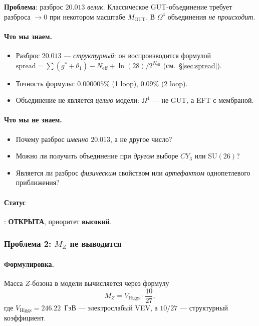 \documentclass[11pt,a4paper]{article}
\newcommand{\SU}{\ensuremath{\mathrm{SU}}}
\newcommand{\CY}{\ensuremath{CY_3}}
\newcommand{\Om}{\ensuremath{\Omega^4}}
\theoremstyle{definition}
\begin{document}
\medskip\noindent
\textbf{Проблема}: разброс $20.013$ \emph{велик}.
Классическое GUT-объединение требует разброса $\to 0$
при некотором масштабе $M_{\text{GUT}}$. В $\Om$ объединения
\emph{не происходит}.

\paragraph{Что мы знаем.}
\begin{itemize}
    \item Разброс $20.013$ --- \emph{структурный}: он
          воспроизводится формулой
          $\text{spread} = \sum(g^*+\theta_1) - N_{\text{eff}}
          + \ln(28)/2^{N_{\text{eff}}}$ (см.~\S\ref{sec:spread}).
    \item Точность формулы: $0.000005\%$ (1 loop),
          $0.09\%$ (2 loop).
    \item Объединение не является \emph{целью} модели:
          $\Om$ --- не GUT, а EFT с мембраной.
\end{itemize}

\paragraph{Что мы не знаем.}
\begin{itemize}
    \item Почему разброс \emph{именно} $20.013$, а не
          другое число?
    \item Можно ли получить объединение при \emph{другом}
          выборе $\CY$ или $\SU(26)$?
    \item Является ли разброс \emph{физическим} свойством
          или \emph{артефактом} однопетлевого приближения?
\end{itemize}

\paragraph{Статус}: \textbf{ОТКРЫТА}, приоритет \textbf{высокий}.

\subsubsection{Проблема 2: \texorpdfstring{$M_Z$}{M\_Z} не выводится}

\paragraph{Формулировка.}
Масса $Z$-бозона в модели вычисляется через формулу
\begin{equation}
    M_Z = V_{\text{Higgs}} \cdot \frac{10}{27},
    \label{eq:MZ-formula}
\end{equation}
где $V_{\text{Higgs}} = 246.22$~ГэВ --- электрослабый VEV,
а $10/27$ --- структурный коэффициент.
\end{document}
